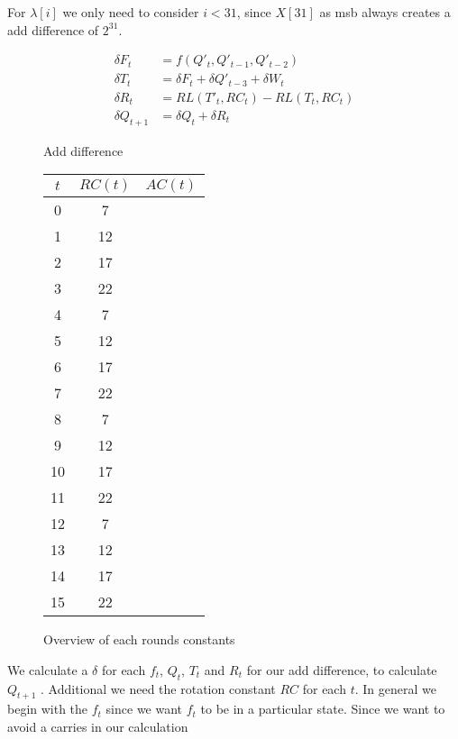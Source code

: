 For $\lambda \left[i\right]$ we only need to consider $i < 31$, since $X \left[ 31 \right]$ as msb always creates a add difference of $2^{31}$.\\
\begin{figure}
    \begin{align*}
        \delta F_t &= f \left( Q'_t,Q'_{t-1},Q'_{t-2} \right) \\
        \delta T_t &= \delta F_t + \delta  Q'_{t-3} + \delta W_t \\
        \delta R_t &=  RL \left(T'_t,RC_t \right) - RL \left(T_t,RC_t \right)\\
        \delta Q_{t+1} &= \delta Q_t + \delta R_t
    \end{align*}
    \caption[short]{Add difference}
    \label{md5delta}
\end{figure}
\newpage
\begin{wrapfigure}[]{r}{0.3\textwidth}
        \begin{tabular}{| c | c | c |}
            \hline
            $t$ & $RC(t)$ & $AC(t)$    \\
            \hline
            \hline
            0  & 7  & \\
            1  & 12 & \\
            2  & 17 & \\
            3  & 22 & \\
            4  & 7  & \\
            5  & 12 & \\
            6  & 17 & \\
            7  & 22 & \\
            8  & 7  & \\
            9  & 12 & \\
            10 & 17 & \\
            11 & 22 & \\
            12 & 7  & \\
            13 & 12 & \\
            14 & 17 & \\
            15 & 22 & \\
            \hline
        \end{tabular}
        \caption{Overview of each rounds constants}
        \label{RC}

    \end{wrapfigure}
We calculate a $\delta$ for each $f_t$, $Q_t$, $T_t$ and $R_t$ for our add difference, to calculate $Q_{t+1}$ .
Additional we need the rotation constant $RC$ for each $t$. 
In general we begin with the $f_t$ since we want $f_t$ to be in a particular state.
Since we want to avoid a carries in our calculation 


